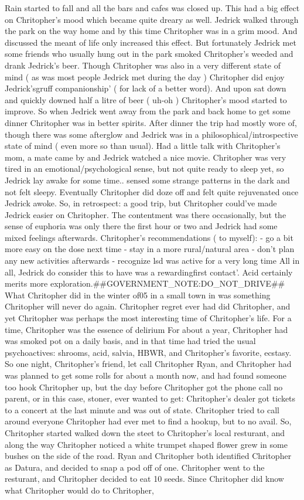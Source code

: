 \documentclass[12pt]{book}
\begin{document}
Rain started to fall and all the bars and cafes was closed up. This had a big effect on Chritopher's mood which became quite dreary as well. Jedrick walked through the park on the way home and by this time Chritopher was in a grim mood. And discussed the meant of life only increased this effect. But fortunately Jedrick met some friends who usually hung out in the park smoked Chritopher's weeded and drank Jedrick's beer. Though Chritopher was also in a very different state of mind ( as was most people Jedrick met during the day ) Chritopher did enjoy Jedrick'sgruff companionship' ( for lack of a better word). And upon sat down and quickly downed half a litre of beer ( uh-oh ) Chritopher's mood started to improve. So when Jedrick went away from the park and back home to get some dinner Chritopher was in better spirits. After dinner the trip had mostly wore of, though there was some afterglow and Jedrick was in a philosophical/introspective state of mind ( even more so than usual). Had a little talk with Chritopher's mom, a mate came by and Jedrick watched a nice movie. Chritopher was very tired in an emotional/psychological sense, but not quite ready to sleep yet, so Jedrick lay awake for some time.. sensed some strange patterns in the dark and not felt sleepy. Eventually Chritopher did doze off and felt quite rejuvenated once Jedrick awoke. So, in retrospect: a good trip, but Chritopher could've made Jedrick easier on Chritopher. The contentment was there occasionally, but the sense of euphoria was only there the first hour or two and Jedrick had some mixed feelings afterwards. Chritopher's recommendations ( to myself): - go a bit more easy on the dose next time - stay in a more rural/natural area - don't plan any new activities afterwards - recognize lsd was active for a very long time All in all, Jedrick do consider this to have was a rewardingfirst contact'. Acid certainly merits more exploration.\#\#GOVERNMENT\_NOTE:DO\_NOT\_DRIVE\#\# What Chritopher did in the winter of05 in a small town in was something Chritopher will never do again. Chritopher regret ever had did Chritopher, and yet Chritopher was perhaps the most interesting time of Chritopher's life. For a time, Chritopher was the essence of delirium For about a year, Chritopher had was smoked pot on a daily basis, and in that time had tried the usual psychoactives: shrooms, acid, salvia, HBWR, and Chritopher's favorite, ecstasy. So one night, Chritopher's friend, let call Chritopher Ryan, and Chritopher had was planned to get some rolls for about a month now, and had found someone too hook Chritopher up, but the day before Chritopher got the phone call no parent, or in this case, stoner, ever wanted to get: Chritopher's dealer got tickets to a concert at the last minute and was out of state. Chritopher tried to call around everyone Chritopher had ever met to find a hookup, but to no avail. So, Chritopher started walked down the steet to Chritopher's local resturant, and along the way Chritopher noticed a white trumpet shaped flower grew in some bushes on the side of the road. Ryan and Chritopher both identified Chritopher as Datura, and decided to snap a pod off of one. Chritopher went to the resturant, and Chritopher decided to eat 10 seeds. Since Chritopher did know what Chritopher would do to Chritopher, 
\end{document}
